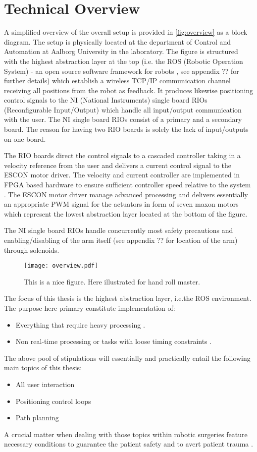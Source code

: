 \section{Technical Overview}
A simplified overview of the overall setup is provided in \autoref{fig:overview} as a block diagram. The setup is physically located at the department of Control and Automation at Aalborg University in the laboratory. The figure is structured with the highest abstraction layer at the top (i.e. the ROS (Robotic Operation System) - an open source software framework for robots \citep{bib:ros}, see appendix ?? for further details) which establish a wireless TCP/IP communication channel receiving all positions from the robot as feedback. It produces likewise positioning control signals to the NI (National Instruments) single board RIOs (Reconfigurable Input/Output) which handle all input/output communication with the user. The NI single board RIOs consist of a primary and a secondary board. The reason for having two RIO boards is solely the lack of input/outputs on one board.

The RIO boards direct the control signals to a cascaded controller taking in a velocity reference from the user and delivers a current control signal to the ESCON motor driver. The velocity and current controller are implemented in FPGA based hardware to ensure sufficient controller speed relative to the system \citep{bib:robot_paper}. The ESCON motor driver manage advanced processing and delivers essentially an appropriate PWM signal for the  actuators in form of seven maxon motors which represent the lowest abstraction layer located at the bottom of the figure.

The NI single board RIOs handle concurrently most safety precautions and enabling/disabling of the arm itself (see appendix ?? for location of the arm) through solenoids.
\begin{figure}[H]
	\center
	\texttt{[image: overview.pdf]}	\caption{This is a nice figure. Here illustrated for hand roll master.}
	\label{fig:overview}
\end{figure}
The focus of this thesis is the highest abstraction layer, i.e.the ROS environment. The purpose here primary constitute implementation of:
\begin{itemize}
\item Everything that require heavy processing \citep{bib:robot_paper}.
\item Non real-time processing or tasks with loose timing constraints \citep{bib:robot_paper}.
\end{itemize}
The above pool of stipulations will essentially and practically entail the following main topics of this thesis:
\begin{itemize}
\item All user interaction
\item Positioning control loops
\item Path planning
\end{itemize}
A crucial matter when dealing with those topics within robotic surgeries feature necessary conditions to guarantee the patient safety and to avert patient trauma \citep{bib:safety}.
